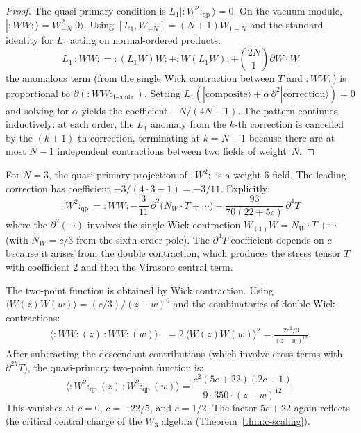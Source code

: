 \begin{proof}
The quasi-primary condition is $L_1|{:}W^2{:}_{\mathrm{qp}}\rangle = 0$.
On the vacuum module, $|{:}WW{:}\rangle = W_{-N}^2|0\rangle$.
Using $[L_1, W_{-N}] = (N+1)W_{1-N}$ and the standard identity
for $L_1$ acting on normal-ordered products:
\[
L_1\,{:}WW{:} = {:}(L_1 W)W{:} + {:}W(L_1 W){:} + \binom{2N}{1}\partial W \cdot W
\]
the anomalous term (from the single Wick contraction between $T$
and ${:}WW{:}$) is proportional to $\partial({:}WW{:}_{\text{1-contr}})$.
Setting $L_1(|\text{composite}\rangle + \alpha\,\partial^2|\text{correction}\rangle) = 0$
and solving for $\alpha$ yields the coefficient $-N/(4N-1)$.
The pattern continues inductively: at each order, the $L_1$
anomaly from the $k$-th correction is cancelled by the
$(k+1)$-th correction, terminating at $k = N-1$ because
there are at most $N-1$ independent contractions between two
fields of weight~$N$.
\end{proof}

\begin{example}\label{ex:W-squared-W3}
For $N = 3$, the quasi-primary projection of ${:}W^2{:}$ is a
weight-6 field.  The leading correction has coefficient
$-3/(4\cdot 3 - 1) = -3/11$.  Explicitly:
\begin{equation}\label{eq:W2-W3}
{:}W^2{:}_{\mathrm{qp}} = {:}WW{:}
  - \frac{3}{11}\,\partial^2\bigl(N_W\cdot T + \cdots\bigr)
  + \frac{93}{70(22+5c)}\,\partial^4 T
\end{equation}
where the $\partial^2(\cdots)$ involves the single Wick
contraction $W_{(1)}W = N_W\cdot T + \cdots$ (with
$N_W = c/3$ from the sixth-order pole).  The $\partial^4 T$
coefficient depends on $c$ because it arises from the
double contraction, which produces the stress tensor
$T$ with coefficient $2$ and then the Virasoro central
term.
\end{example}

\begin{computation}
\label{comp:W2-twopt}
The two-point function is obtained by Wick contraction.  Using
$\langle W(z)W(w)\rangle = (c/3)/(z-w)^6$ and the combinatorics
of double Wick contractions:
\begin{align}
\langle {:}WW{:}(z)\, {:}WW{:}(w) \rangle
  &= 2\,\langle W(z)W(w)\rangle^2
  = \frac{2c^2/9}{(z-w)^{12}}. \label{eq:WW-wick}
\end{align}
After subtracting the descendant contributions (which involve
cross-terms with $\partial^{2k}T$), the quasi-primary two-point
function is:
\begin{equation}\label{eq:W2qp-twopt}
\langle {:}W^2{:}_{\mathrm{qp}}(z)\, {:}W^2{:}_{\mathrm{qp}}(w)\rangle
  = \frac{c^2(5c+22)(2c-1)}{9 \cdot 350 \cdot (z-w)^{12}}.
\end{equation}
This vanishes at $c = 0$, $c = -22/5$, and $c = 1/2$.  The factor
$5c + 22$ again reflects the critical central charge of the $W_3$
algebra (Theorem~\ref{thm:c-scaling}).
\end{computation}


